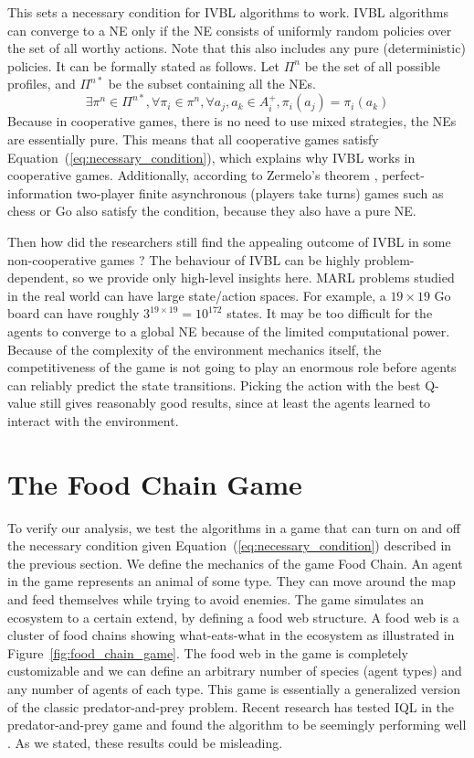 \documentclass[]{interact}
\theoremstyle{plain}%
\theoremstyle{definition}
\theoremstyle{remark}
\begin{document}
This sets a necessary condition for IVBL algorithms to work. IVBL algorithms can converge to a NE only if the NE consists of uniformly random policies over the set of all worthy actions. Note that this also includes any pure (deterministic) policies. It can be formally stated as follows. Let $\Pi^{n}$ be the set of all possible profiles, and $\Pi^{n*}$ be the subset containing all the NEs.
\begin{equation}
    \exists \pi^n \in \Pi^{n*}, \forall \pi_i \in \pi^n, \forall a_j, a_k \in A^+_i, \pi_i(a_j) = \pi_i(a_k)
    \label{eq:necessary_condition}
\end{equation}
Because in cooperative games, there is no need to use mixed strategies, the NEs are essentially pure. This means that all cooperative games satisfy Equation~(\ref{eq:necessary_condition}), which explains why IVBL works in cooperative games. Additionally, according to Zermelo's theorem \cite{schwalbe2001zermelo}, perfect-information two-player finite asynchronous (players take turns) games such as chess or Go also satisfy the condition, because they also have a pure NE.

Then how did the researchers still find the appealing outcome of IVBL in some non-cooperative games \cite{bjornsson2009cadiaplayer, jiang2018q, kopacz2023evaluating, qu2020distributed}? The behaviour of IVBL can be highly problem-dependent, so we provide only high-level insights here. MARL problems studied in the real world can have large state/action spaces. For example, a $19 \times 19$ Go board can have roughly $3^{19 \times 19} = 10^{172}$ states. It may be too difficult for the agents to converge to a global NE because of the limited computational power. Because of the complexity of the environment mechanics itself, the competitiveness of the game is not going to play an enormous role before agents can reliably predict the state transitions. Picking the action with the best Q-value still gives reasonably good results, since at least the agents learned to interact with the environment.

\section{The Food Chain Game}
To verify our analysis, we test the algorithms in a game that can turn on and off the necessary condition given Equation~(\ref{eq:necessary_condition}) described in the previous section. We define the mechanics of the game Food Chain. An agent in the game represents an animal of some type. They can move around the map and feed themselves while trying to avoid enemies. The game simulates an ecosystem to a certain extend, by defining a food web structure. A food web is a cluster of food chains showing what-eats-what in the ecosystem as illustrated in Figure~\ref{fig:food_chain_game}. The food web in the game is completely customizable and we can define an arbitrary number of species (agent types) and any number of agents of each type. This game is essentially a generalized version of the classic predator-and-prey problem. Recent research has tested IQL in the predator-and-prey game and found the algorithm to be seemingly performing well \cite{kopacz2023evaluating}. As we stated, these results could be misleading.
\end{document}
